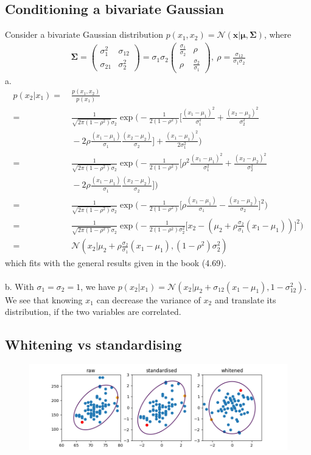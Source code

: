 \subsection{Conditioning a bivariate Gaussian}
Consider a bivariate Gaussian distribution $p(x_1,x_2) = \mathcal{N}(\bm{x}|\bm{\mu},\bm{\Sigma})$, where
\begin{gather*}
\bm{\Sigma} = \begin{pmatrix}\sigma_1^2&\sigma_{12}\\\sigma_{21}&\sigma_2^2\end{pmatrix} = \sigma_1\sigma_2 \begin{pmatrix}\frac{\sigma_1}{\sigma_2}&\rho\\\rho&\frac{\sigma_2}{\sigma_1}\end{pmatrix},\ \rho = \frac{\sigma_{12}}{\sigma_1\sigma_2}
\end{gather*}
a.
\begin{align*}
p(x_2|x_1) =&\ \frac{p(x_1,x_2)}{p(x_1)}\\
=&\ \frac{1}{\sqrt{2\pi(1-\rho^2)}\sigma_2} \exp\bigg( -\frac{1}{2(1-\rho^2)}\bigg[ \frac{(x_1-\mu_1)^2}{\sigma_1^2} + \frac{(x_2-\mu_2)^2}{\sigma_2^2}\\
&\ - 2\rho\frac{(x_1-\mu_1)}{\sigma_1}\frac{(x_2-\mu_2)}{\sigma_2} \bigg] + \frac{(x_1-\mu_1)^2}{2\sigma_1^2} \bigg)\\
=&\ \frac{1}{\sqrt{2\pi(1-\rho^2)}\sigma_2} \exp\bigg( -\frac{1}{2(1-\rho^2)}\bigg[ \rho^2\frac{(x_1-\mu_1)^2}{\sigma_1^2} + \frac{(x_2-\mu_2)^2}{\sigma_2^2}\\
&\ - 2\rho\frac{(x_1-\mu_1)}{\sigma_1}\frac{(x_2-\mu_2)}{\sigma_2} \bigg] \bigg)\\
=&\ \frac{1}{\sqrt{2\pi(1-\rho^2)}\sigma_2} \exp\bigg( -\frac{1}{2(1-\rho^2)}\bigg[ \rho\frac{(x_1-\mu_1)}{\sigma_1} - \frac{(x_2-\mu_2)}{\sigma_2} \bigg]^2 \bigg)\\
=&\ \frac{1}{\sqrt{2\pi(1-\rho^2)}\sigma_2} \exp\bigg( -\frac{1}{2(1-\rho^2)\sigma_2^2}\bigg[ x_2 - (\mu_2 + \rho\frac{\sigma_2}{\sigma_1}(x_1-\mu_1)) \bigg]^2 \bigg)\\
=&\ \mathcal{N}(x_2|\mu_2 + \rho\frac{\sigma_2}{\sigma_1}(x_1-\mu_1),(1-\rho^2)\sigma_2^2)
\end{align*}
which fits with the general results given in the book (4.69).\\\\
b. With $\sigma_1=\sigma_2=1$, we have $p(x_2|x_1) = \mathcal{N}(x_2|\mu_2+\sigma_{12}(x_1-\mu_1),1-\sigma_{12}^2)$. We see that knowing $x_1$ can decrease the variance of $x_2$ and translate its distribution, if the two variables are correlated.

\subsection{Whitening vs standardising}
\begin{figure}[h]
\centering
\includegraphics[width=\linewidth]{4-gaussian-models/48-whiten-stdise}
\end{figure}
